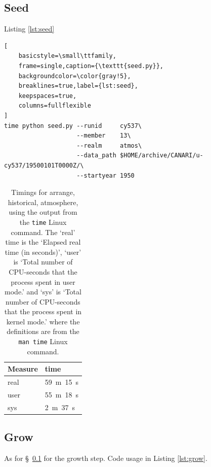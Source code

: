 \documentclass[11pt,a4paper]{article}
\begin{document}
\subsection{Seed}\label{aseed}

Listing \ref{lst:seed}


\begin{center}
\begin{minipage}{\textwidth}
\begin{lstlisting}[
    basicstyle=\small\ttfamily,
    frame=single,caption={\texttt{seed.py}},
    backgroundcolor=\color{gray!5},
    breaklines=true,label={lst:seed},
    keepspaces=true,
    columns=fullflexible
]
time python seed.py --runid     cy537\ 
                    --member    13\
                    --realm     atmos\
                    --data_path $HOME/archive/CANARI/u-cy537/19500101T0000Z/\ 
                    --startyear 1950
\end{lstlisting}
\end{minipage}
\end{center}

\begin{table}[h]
    \centering
    \caption{Timings for arrange, historical, atmosphere, using the output from the \texttt{time} Linux command. The `real' time is the `Elapsed real time (in seconds)', `user' is `Total number of CPU-seconds that the process spent in user mode.' and `sys' is `Total number of CPU-seconds that the process spent in kernel mode.' where the definitions are from the \texttt{man time} Linux command.}
    \label{tab:seedtable}
    \begin{tabular}{l l}
        \hline
        Measure & time  \\
        \hline
         real   & 59~m~15~s  \\
        user   & 55~m~18~s  \\
        sys     & 2~m~37~s  \\ 
        \hline
    \end{tabular}
\end{table}










\subsection{Grow}

As for \S~\ref{aseed} for the growth step. Code usage in Listing \ref{lst:grow}.
\end{document}
